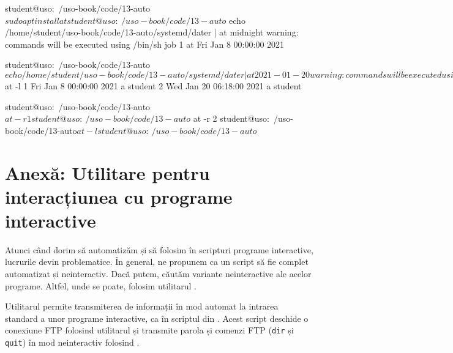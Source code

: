 \begin{screen}[caption={Planificarea unei acțiuni folosind at},label={lst:auto:at}]
student@uso:~/uso-book/code/13-auto$ sudo apt install at

student@uso:~/uso-book/code/13-auto$ echo /home/student/uso-book/code/13-auto/systemd/dater | at midnight
warning: commands will be executed using /bin/sh
job 1 at Fri Jan  8 00:00:00 2021

student@uso:~/uso-book/code/13-auto$ echo /home/student/uso-book/code/13-auto/systemd/dater | at 2021-01-20
warning: commands will be executed using /bin/sh
job 2 at Wed Jan 20 06:18:00 2021

student@uso:~/uso-book/code/13-auto$ at -l
1	Fri Jan  8 00:00:00 2021 a student
2	Wed Jan 20 06:18:00 2021 a student

student@uso:~/uso-book/code/13-auto$ at -r 1
student@uso:~/uso-book/code/13-auto$ at -r 2
student@uso:~/uso-book/code/13-auto$ at -l
student@uso:~/uso-book/code/13-auto$
\end{screen}

\section{Anexă: Utilitare pentru interacțiunea cu programe interactive}
\label{sec:auto:interactive}

Atunci când dorim să automatizăm și să folosim în scripturi programe interactive, lucrurile devin problematice.
În general, ne propunem ca un script să fie complet automatizat și neinteractiv.
Dacă putem, căutăm variante neinteractive ale acelor programe.
Altfel, unde se poate, folosim utilitarul .

Utilitarul  permite transmiterea de informații în mod automat la intrarea standard a unor programe interactive, ca în scriptul  din .
Acest script deschide o conexiune FTP folosind utilitarul  și transmite parola și comenzi FTP (\texttt{dir} și \texttt{quit}) în mod neinteractiv folosind .

